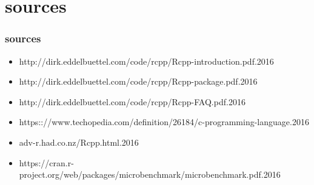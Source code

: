 \documentclass[hyperef={
    colorlinks=true,
    linkcolor=blue,
    filecolor=black,
urlcolor=blue}
]{beamer}
\begin{document}
\section{sources}
\begin{frame}
\frametitle{sources}
\begin{itemize}
\item http://dirk.eddelbuettel.com/code/rcpp/Rcpp-introduction.pdf.2016
\item http://dirk.eddelbuettel.com/code/rcpp/Rcpp-package.pdf.2016
\item http://dirk.eddelbuettel.com/code/rcpp/Rcpp-FAQ.pdf.2016
\item https:://www.techopedia.com/definition/26184/c-programming-language.2016
\item adv-r.had.co.nz/Rcpp.html.2016
\item https://cran.r-project.org/web/packages/microbenchmark/microbenchmark.pdf.2016
\end{itemize}
\end{frame}
\end{document}
